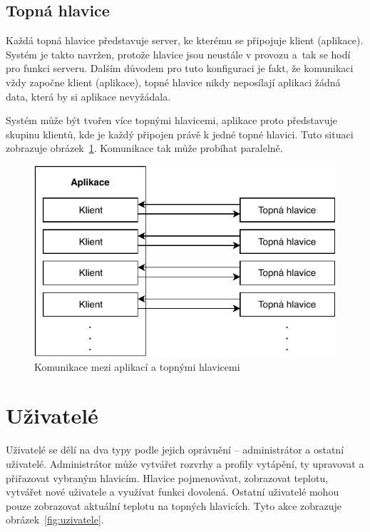 \documentclass[thesis=B,czech]{FITthesis}[2012/10/20]
\begin{document}
\subsection{Topná hlavice}

Každá topná hlavice představuje server, ke kterému se připojuje klient (aplikace). Systém je takto navržen, protože hlavice jsou neustále v provozu a~tak se hodí pro funkci serveru. Dalším důvodem pro tuto konfiguraci je fakt, že komunikaci vždy započne klient (aplikace), topné hlavice nikdy neposílají aplikaci žádná data, která by si aplikace nevyžádala.

Systém může být tvořen více topnými hlavicemi, aplikace proto představuje skupinu klientů, kde je každý připojen právě k jedné topné hlavici. Tuto situaci zobrazuje obrázek~\ref{fig:comAppHeat}. Komunikace tak může probíhat paralelně. 

\begin{figure}\centering
	\includegraphics{diagrams/KomunikaceAppHeaters}
	\caption{Komunikace mezi aplikací a topnými hlavicemi}\label{fig:comAppHeat}
\end{figure}

\section{Uživatelé}
Uživatelé se dělí na dva typy podle jejich oprávnění – administrátor a ostatní uživatelé. Administrátor může vytvářet rozvrhy a profily vytápění, ty upravovat a přiřazovat vybraným hlavicím. Hlavice pojmenovávat, zobrazovat teplotu, vytvářet nové uživatele a využívat funkci dovolená. Ostatní uživatelé mohou pouze zobrazovat aktuální teplotu na topných hlavicích. Tyto akce zobrazuje obrázek~\ref{fig:uzivatele}.
\end{document}
